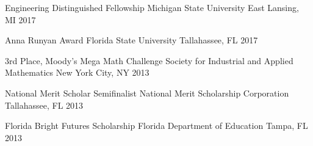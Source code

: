 



\begin{cvhonors}

  \cvhonor
    {Engineering Distinguished Fellowship} %
    {Michigan State University} %
    {East Lansing, MI} %
    {2017} %

  \cvhonor
    {Anna Runyan Award} %
    {Florida State University} %
    {Tallahassee, FL} %
    {2017} %

  \cvhonor
    {3rd Place, Moody's Mega Math Challenge} %
    {Society for Industrial and Applied Mathematics} %
    {New York City, NY} %
    {2013} %

  \cvhonor
    {National Merit Scholar Semifinalist} %
    {National Merit Scholarship Corporation} %
    {Tallahassee, FL} %
    {2013} %

  \cvhonor
    {Florida Bright Futures Scholarship} %
    {Florida Department of Education} %
    {Tampa, FL} %
    {2013} %


\end{cvhonors}

